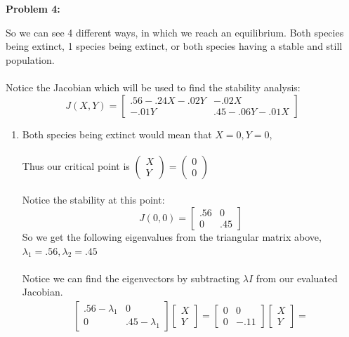 \documentclass[11pt]{article}
\newenvironment{problem}[1]{\textbf{Problem #1: }}{\newpage}
\begin{document}
\begin{problem}{4}
\begin{enumerate}[label = (\alph*)]
			So we can see 4 different ways, in which we reach an equilibrium.  Both species being extinct, 1 species being extinct, or both species having a stable and still population. 
			\\ \\
			Notice the Jacobian which will be used to find the stability analysis:
			\[J(X,Y) = \begin{bmatrix}
				.56 - .24X - .02Y & -.02X \\
				-.01Y & .45 - .06Y - .01X
			\end{bmatrix}\] 
			\newpage
			\begin{enumerate}[label = (\roman*)]
				\item Both species being extinct would mean that $X = 0, Y = 0$, \\ \\ Thus our critical point is $\begin{pmatrix}
				X \\ Y 
				\end{pmatrix} = \begin{pmatrix}
				0 \\ 0
				\end{pmatrix}$
				\\ \\
				Notice the stability at this point:
				\[J(0,0) = \begin{bmatrix}
					.56 & 0 \\ 0 & .45
				\end{bmatrix}\]
				So we get the following eigenvalues from the triangular matrix above, $\lambda_1 = .56, \lambda_2 = .45$
				\\ \\
				Notice we can find the eigenvectors by subtracting $\lambda I$ from our evaluated Jacobian.
				\begin{align*}
					 \begin{bmatrix}
					.56 - \lambda_1 & 0 \\ 0 & .45-\lambda_1 
					\end{bmatrix}\begin{bmatrix}
						X \\ Y
					\end{bmatrix} = 
					 \begin{bmatrix}
					0 & 0 \\ 0 & -.11
					\end{bmatrix}\begin{bmatrix}
					X \\ Y
					\end{bmatrix} = 

\end{align*}
\end{enumerate}
\end{enumerate}
\end{problem}
\end{document}
